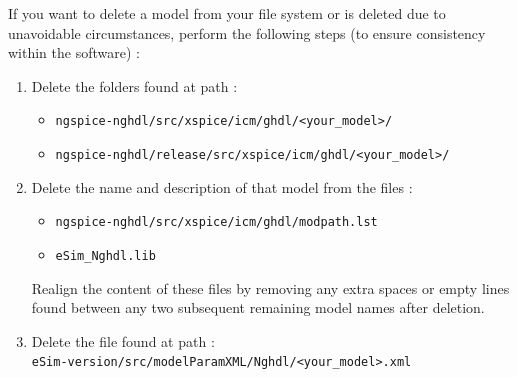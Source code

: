If you want to delete a model from your file system or is deleted due to unavoidable circumstances, perform the following steps (to ensure consistency within the software) :
\begin{enumerate}
    \item Delete the folders found at path :
        \begin{itemize}
        \item
        \texttt{ngspice-nghdl/src/xspice/icm/ghdl/<your\_model>/} 
        \item \texttt{ngspice-nghdl/release/src/xspice/icm/ghdl/<your\_model>/}
        \end{itemize}
    \item Delete the name and description of that model from the files :
        \begin{itemize}
        \item
     \texttt{ngspice-nghdl/src/xspice/icm/ghdl/modpath.lst}
     \item  \texttt{eSim\_Nghdl.lib}
     \end{itemize}
    
     Realign the content of these files by            removing any extra spaces or empty lines found between any two subsequent remaining         model names after deletion.
    
    \item Delete the file found at path : \\
    \texttt{eSim-version/src/modelParamXML/Nghdl/<your\_model>.xml}
\pagebreak

\end{enumerate}
